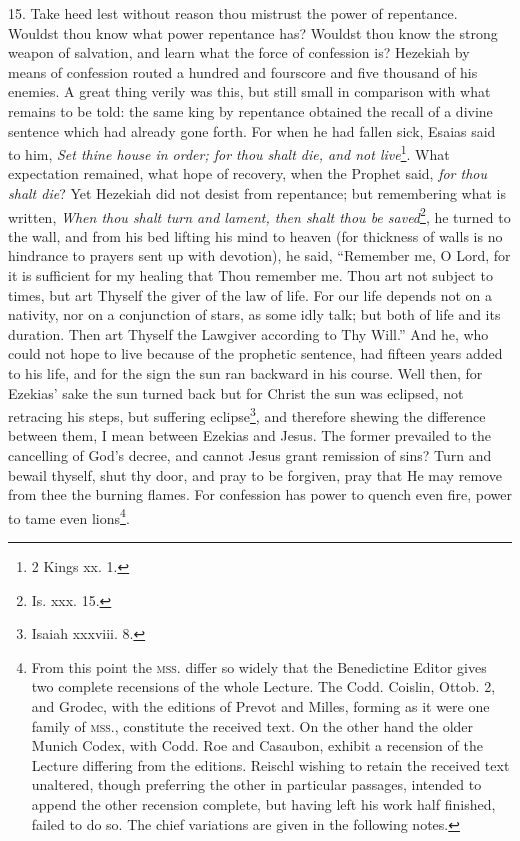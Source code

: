 15. Take heed lest without reason thou mistrust the power of repentance. Wouldst thou know what power repentance has? Wouldst thou know the strong weapon of salvation, and learn what the force of confession is? Hezekiah by means of confession routed a hundred and fourscore and five thousand of his enemies. A great thing verily was this, but still small in comparison with what remains to be told: the same king by repentance obtained the recall of a divine sentence which had already gone forth. For when he had fallen sick, Esaias said to him, \emph{Set thine house in order; for thou shalt die, and not live}\footnote{2 Kings xx. 1.}. What expectation remained, what hope of recovery, when the Prophet said, \emph{for thou shalt die}? Yet Hezekiah did not desist from repentance; but remembering what is written, \emph{When thou shalt turn and lament, then shalt thou be saved}\footnote{Is. xxx. 15.}, he turned to the wall, and from his bed lifting his mind to heaven (for thickness of walls is no hindrance to prayers sent up with devotion), he said, “Remember me, O Lord, for it is sufficient for my healing that Thou remember me. Thou art not subject to times, but art Thyself the giver of the law of life. For our life depends not on a nativity, nor on a conjunction of stars, as some idly talk; but both of life and its duration. Then art Thyself the Lawgiver according to Thy Will.” And he, who could not hope to live because of the prophetic sentence, had fifteen years added to his life, and for the sign the sun ran backward in his course. Well then, for Ezekias’ sake the sun turned back but for Christ the sun was eclipsed, not retracing his steps, but suffering eclipse\footnote{Isaiah xxxviii. 8.}, and therefore shewing the difference between them, I mean between Ezekias and Jesus. The former prevailed to the cancelling of God’s decree, and cannot Jesus grant remission of sins? Turn and bewail thyself, shut thy door, and pray to be forgiven, pray that He may remove from thee the burning flames. For confession has power to quench even fire, power to tame even lions\footnote{From this point the \textsc{mss.} differ so widely that the Benedictine Editor gives two complete recensions of the whole Lecture. The Codd. Coislin, Ottob. 2, and Grodec, with the editions of Prevot and Milles, forming as it were one family of \textsc{mss.}, constitute the received text. On the other hand the older Munich Codex, with Codd. Roe and Casaubon, exhibit a recension of the Lecture differing from the editions. Reischl wishing to retain the received text unaltered, though preferring the other in particular passages, intended to append the other recension complete, but having left his work half finished, failed to do so. The chief variations are given in the following notes.}.

